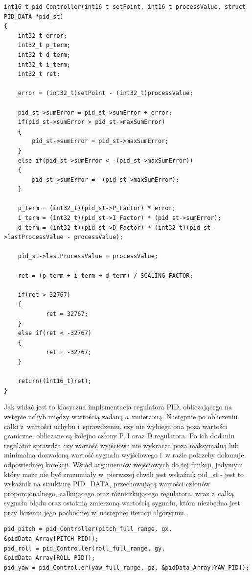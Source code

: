 \documentclass[11pt, twoside]{Thesis} %
\begin{document}
\begin{lstlisting}
int16_t pid_Controller(int16_t setPoint, int16_t processValue, struct PID_DATA *pid_st)
{
	int32_t error;
	int32_t p_term;
	int32_t d_term;
	int32_t i_term; 
	int32_t ret;

  	error = (int32_t)setPoint - (int32_t)processValue;

	pid_st->sumError = pid_st->sumError + error;
	if(pid_st->sumError > pid_st->maxSumError)
	{
		pid_st->sumError = pid_st->maxSumError;
	}
	else if(pid_st->sumError < -(pid_st->maxSumError))
	{
		pid_st->sumError = -(pid_st->maxSumError);
	}
	
	p_term = (int32_t)(pid_st->P_Factor) * error;
  	i_term = (int32_t)(pid_st->I_Factor) * (pid_st->sumError);
  	d_term = (int32_t)(pid_st->D_Factor) * (int32_t)(pid_st->lastProcessValue - processValue);

  	pid_st->lastProcessValue = processValue;

  	ret = (p_term + i_term + d_term) / SCALING_FACTOR;
  
 	if(ret > 32767)
	{
    		ret = 32767;
  	}
  	else if(ret < -32767)
	{
    		ret = -32767;
  	}

  	return((int16_t)ret);
}
\end{lstlisting}

Jak widać jest to klasyczna implementacja regulatora PID, obliczającego na wstępie uchyb między wartością zadaną a~zmierzoną. Następnie po obliczeniu całki z~wartości uchybu i~sprawdzeniu, czy nie wybiega ona poza wartości graniczne, obliczane są kolejno człony P, I oraz D regulatora. Po ich dodaniu regulator sprawdza czy wartość wyjściowa nie wykracza poza maksymalną lub minimalną dozwoloną wartość sygnału wyjściowego i~w razie potrzeby dokonuje odpowiedniej korekcji. Wśród argumentów wejściowych do tej funkcji, jedymym który może nie być zrozumiały w~pierwszej chwili jest wskaźnik pid\_st - jest to wskaźnik na strukturę PID\_DATA, przechowującą wartości członów proporcjonalnego, całkującego oraz różniczkującego regulatora, wraz z~całką sygnału błędu oraz ostatnią zmierzoną wartością sygnału, która niezbędna jest przy liczeniu jego pochodnej w~następnej iteracji algorytmu.

\begin{lstlisting}
pid_pitch = pid_Controller(pitch_full_range, gx, &pidData_Array[PITCH_PID]);
pid_roll = pid_Controller(roll_full_range, gy, &pidData_Array[ROLL_PID]);
pid_yaw = pid_Controller(yaw_full_range, gz, &pidData_Array[YAW_PID]);
\end{lstlisting}
\end{document}
